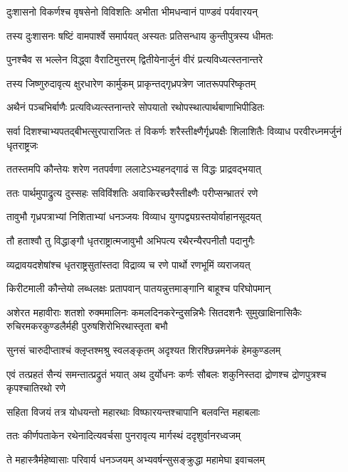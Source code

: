 \twolineshloka
{दुःशासनो विकर्णश्च वृषसेनो विविशतिः}
{अभीता भीमधन्वानं पाण्डवं पर्यवारयन्}


\twolineshloka
{तस्य दुःशासनः षष्टिं वामपार्श्वे समार्पयत्}
{अस्यतः प्रतिसन्धाय कुन्तीपुत्रस्य धीमतः}


\twolineshloka
{पुनश्चैव स भल्लेन विद्ध्वा वैराटिमुत्तरम्}
{द्वितीयेनार्जुनं वीरं प्रत्यविध्यत्स्तनान्तरे}


\twolineshloka
{तस्य जिष्णुरुदावृत्य क्षुरधारेण कार्मुकम्}
{प्राकृन्तद्गृध्रपत्रेण जातरूपपरिष्कृतम्}


\twolineshloka
{अथैनं पञ्चभिर्बाणैः प्रत्यविध्यत्स्तनान्तरे}
{सोपयातो रथोपस्थात्पार्थबाणाभिपीडितः}


\threelineshloka
{सर्वा दिशश्चाभ्यपतद्बीभत्सुरपाराजितः}
{तं विकर्णः शरैस्तीक्ष्णैर्गृध्रपक्षैः शिलाशितैः}
{विव्याध परवीरध्नमर्जुनं धृतराष्ट्रजः}


\twolineshloka
{ततस्तमपि कौन्तेयः शरेण नतपर्वणा}
{ललाटेऽभ्यहनद्गाढं स विद्धः प्राद्रवद्भयात्}


\twolineshloka
{ततः पार्थमुपाद्रुत्य दुस्सहः सविविंशतिः}
{अवाकिरच्छरैस्तीक्ष्णैः परीप्सन्भ्रातरं रणे}


\twolineshloka
{तावुभौ गृध्रपत्राभ्यां निशिताभ्यां धनञ्जयः}
{विव्याध युगपद्व्यग्रस्तयोर्वाहानसूदयत्}


\twolineshloka
{तौ हताश्वौ तु विद्धाङ्गौ धृतराष्ट्रात्मजावुभौ}
{अभिपत्य रथैरन्यैरपनीतौ पदानुगैः}


\twolineshloka
{व्यद्रावयदशेषांश्च धृतराष्ट्रसुतांस्तदा}
{विद्राव्य च रणे पार्थो रणभूमिं व्यराजयत्}


\twolineshloka
{किरीटमाली कौन्तेयो लब्धलक्षः प्रतापवान्}
{पातयन्नुत्तमाङ्गानि बाहूश्च परिघोपमान्}


\onelineshloka
{अशेरत महावीराः शतशो रुक्ममालिनः}
\twolineshloka
{कमलदिनकरेन्दुसन्निभैः सितदशनैः सुमुखाक्षिनासिकैः}
{रुचिरमकरकुण्डलैर्मही पुरुषशिरोभिरथास्तृता बभौ}


\twolineshloka
{सुनसं चारुदीप्ताश्चं क्लृप्तश्मश्रु स्वलङ्कृतम्}
{अदृश्यत शिरश्छिन्नमनेकं हेमकुण्डलम्}


\onelineshloka
{एवं तत्प्रहतं सैन्यं समन्तात्प्रद्रुतं भयात्}
\twolineshloka
{अथ दुर्योधनः कर्णः सौबलः शकुनिस्तदा}
{द्रोणश्च द्रोणपुत्रश्च कृपश्चातिरथो रणे}


\twolineshloka
{सहिता विजयं तत्र योधयन्तो महारथाः}
{विष्फारयन्तश्चापानि बलवन्ति महाबलाः}


\twolineshloka
{ततः कीर्णपताकेन रथेनादित्यवर्चसा}
{पुनरावृत्य मार्गस्थं ददृशुर्वानरध्वजम्}


\twolineshloka
{ते महास्त्रैर्महेष्वासाः परिवार्य धनञ्जयम्}
{अभ्यवर्षन्सुसङ्क्रुद्धा महामेघा इवाचलम्}


